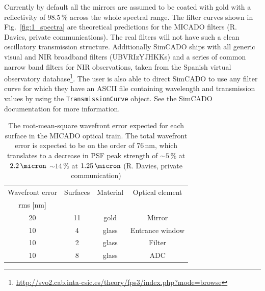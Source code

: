 
Currently by default all the mirrors are assumed to be coated with gold with a reflectivity of 98.5\,\% across the whole spectral range. The filter curves shown in Fig.~\ref{fig:1_spectra} are theoretical predictions for the MICADO filters (R. Davies, private communications). The real filters will not have such a clean oscillatory transmission structure. Additionally SimCADO ships with all generic visual and NIR broadband filters (UBVRIzYJHKKs) and a series of common narrow band filters for NIR observations, taken from the Spanish virtual observatory database\footnote{\url{http://svo2.cab.inta-csic.es/theory/fps3/index.php?mode=browse}}. The user is also able to direct SimCADO to use any filter curve for which they have an ASCII file containing wavelength and transmission values by using the \verb+TransmissionCurve+ object. See the SimCADO documentation for more information. 


\begin{table}

    \centering
    \caption{The root-mean-square wavefront error expected for each surface in the MICADO optical train. The total wavefront error is expected to be on the order of 76\,nm, which translates to a decrease in PSF peak strength of $\sim 5\,\%$ at $2.2\,\micron$ $\sim14\,\%$ at $1.25\,\micron$ (R. Davies, private communication)}
     \begin{tabular}{c c c c}
        \hline\hline
        Wavefront error &  Surfaces  &   Material  &  Optical element \\
         rms [nm]       &            &             &                  \\
        \hline
        20              &     11     &       gold  &      Mirror \\
        10              &      4     &       glass &      Entrance window \\
        10              &      2     &       glass &      Filter \\
        10              &     8      &       glass &      ADC\\
        \hline
    \end{tabular}
    \label{tab:wfe_individual}

\end{table}


